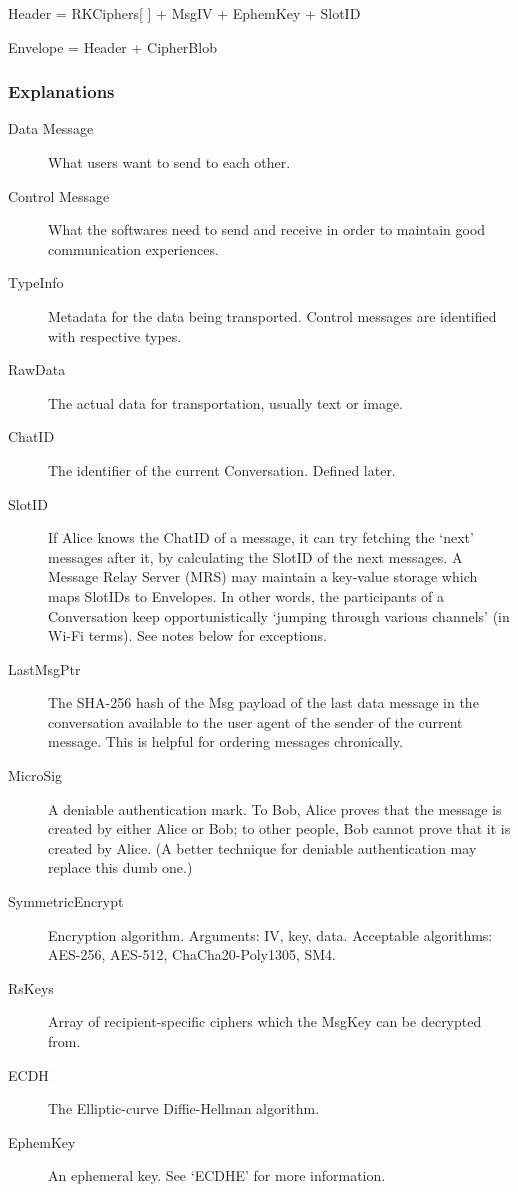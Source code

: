 \documentclass[a4paper,11pt]{article}
\begin{document}
\istep Header = RKCiphers[ ] + MsgIV + EphemKey + SlotID

\istep Envelope = Header + CipherBlob

\istepend

\subsubsection{Explanations}

\begin{description}
    \item[Data Message] What users want to send to each other.
    \item[Control Message] What the softwares need to send and receive in order to maintain good communication experiences.
    \item[TypeInfo] Metadata for the data being transported. Control messages are identified with respective types.
    \item[RawData] The actual data for transportation, usually text or image.
    \item[ChatID] The identifier of the current Conversation. Defined later.
    \item[SlotID] If Alice knows the ChatID of a message, it can try fetching the `next' messages after it, by calculating the SlotID of the next messages. A Message Relay Server (MRS) may maintain a key-value storage which maps SlotIDs to Envelopes. In other words, the participants of a Conversation keep opportunistically `jumping through various channels' (in Wi-Fi terms). See notes below for exceptions.
    \item[LastMsgPtr] The SHA-256 hash of the Msg payload of the last data message in the conversation available to the user agent of the sender of the current message. This is helpful for ordering messages chronically.
    \item[MicroSig] A deniable authentication mark. To Bob, Alice proves that the message is created by either Alice or Bob; to other people, Bob cannot prove that it is created by Alice. (A better technique for deniable authentication may replace this dumb one.)
    \item[SymmetricEncrypt] Encryption algorithm. Arguments: IV, key, data. Acceptable algorithms: AES-256, AES-512, ChaCha20-Poly1305, SM4.
    \item[RsKeys] Array of recipient-specific ciphers which the MsgKey can be decrypted from.
    \item[ECDH] The Elliptic-curve Diffie-Hellman algorithm.
    \item[EphemKey] An ephemeral key. See `ECDHE' for more information.
\end{description}
\end{document}
